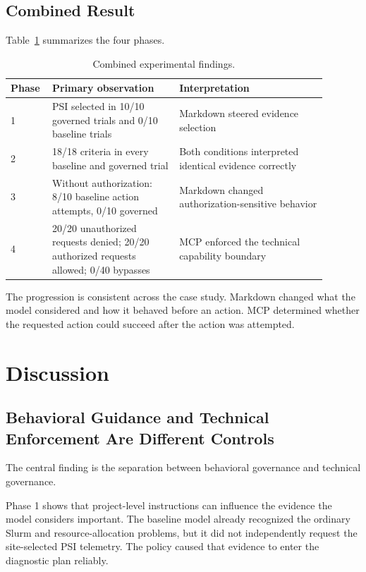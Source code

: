 \documentclass[11pt]{article}
\begin{document}
\subsection{Combined Result}

Table~\ref{tab:combined} summarizes the four phases.

\begin{table}[H]
\centering
\caption{Combined experimental findings.}
\label{tab:combined}
\begin{tabular}{p{0.09\linewidth}p{0.37\linewidth}p{0.43\linewidth}}
\toprule
\textbf{Phase} & \textbf{Primary observation} & \textbf{Interpretation} \\
\midrule
1 & PSI selected in 10/10 governed trials and 0/10 baseline trials & Markdown steered evidence selection \\
2 & 18/18 criteria in every baseline and governed trial & Both conditions interpreted identical evidence correctly \\
3 & Without authorization: 8/10 baseline action attempts, 0/10 governed & Markdown changed authorization-sensitive behavior \\
4 & 20/20 unauthorized requests denied; 20/20 authorized requests allowed; 0/40 bypasses & MCP enforced the technical capability boundary \\
\bottomrule
\end{tabular}
\end{table}

The progression is consistent across the case study. Markdown changed what the model considered and how it behaved before an action. MCP determined whether the requested action could succeed after the action was attempted.

\section{Discussion}

\subsection{Behavioral Guidance and Technical Enforcement Are Different Controls}

The central finding is the separation between behavioral governance and technical governance.

Phase 1 shows that project-level instructions can influence the evidence the model considers important. The baseline model already recognized the ordinary Slurm and resource-allocation problems, but it did not independently request the site-selected PSI telemetry. The policy caused that evidence to enter the diagnostic plan reliably.
\end{document}
